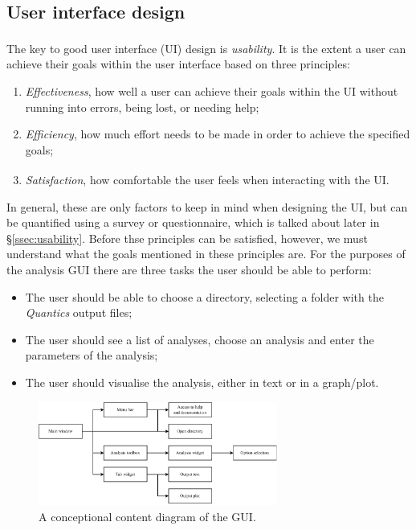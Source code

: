 \documentclass[12pt]{article}
\begin{document}
\subsection{User interface design}\label{ssec:ui_design}

The key to good user interface (UI) design is \textit{usability}.\textsuperscript{\cite{uid}} It is the extent a user can achieve their goals within the user interface based on three principles:
\begin{enumerate}
    \item \textit{Effectiveness}, how well a user can achieve their goals within the UI without running into errors, being lost, or needing help;
    \item \textit{Efficiency}, how much effort needs to be made in order to achieve the specified goals;
    \item \textit{Satisfaction}, how comfortable the user feels when interacting with the UI.\textsuperscript{\cite{iso}}
\end{enumerate}

In general, these are only factors to keep in mind when designing the UI, but can be quantified using a survey or questionnaire, which is talked about later in \S\ref{ssec:usability}. Before thse principles can be satisfied, however, we must understand what the goals mentioned in these principles are. For the purposes of the analysis GUI there are three tasks the user should be able to perform:
\begin{itemize}
    \item The user should be able to choose a directory, selecting a folder with the \textit{Quantics} output files;
    \item The user should see a list of analyses, choose an analysis and enter the parameters of the analysis;
    \item The user should visualise the analysis, either in text or in a graph/plot.
\end{itemize}

\begin{figure}[h]
    \centering
    \includegraphics[page=1, width=0.7\textwidth]{img/content_diagram.pdf}
    \caption{A conceptional content diagram of the GUI.}
    \label{fig:content_diagram}
\end{figure}
\end{document}
